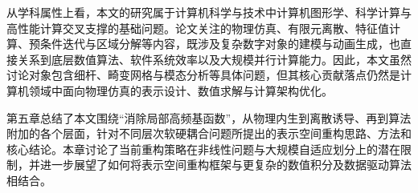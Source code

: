 从学科属性上看，本文的研究属于计算机科学与技术中计算机图形学、科学计算与高性能计算交叉支撑的基础问题。论文关注的物理仿真、有限元离散、特征值计算、预条件迭代与区域分解等内容，既涉及复杂数字对象的建模与动画生成，也直接关系到底层数值算法、软件系统效率以及大规模并行计算能力。因此，本文虽然讨论对象包含细杆、畸变网格与模态分析等具体问题，但其核心贡献落点仍然是计算机领域中面向物理仿真的表示设计、数值求解与计算架构优化。

第五章总结了本文围绕“消除局部高频基函数”，从物理内生到离散诱导、再到算法附加的各个层面，针对不同层次软硬耦合问题所提出的表示空间重构思路、方法和核心结论。本章讨论了当前重构策略在非线性问题与大规模自适应划分上的潜在限制，并进一步展望了如何将表示空间重构框架与更复杂的数值积分及数据驱动算法相结合。
